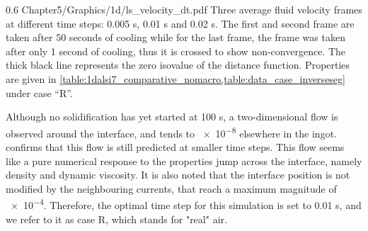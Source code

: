 



\begin{figureth}
{0.6}
{Chapter5/Graphics/1d/ls_velocity_dt.pdf}
{Three average fluid velocity frames at different time steps: 0.005 s, 0.01 s and 0.02 s. The first and second frame are taken after 
50 seconds of cooling while for the last frame, the frame was taken after only 1 second of cooling, thus it is crossed to show non-convergence.
The thick black line represents the zero isovalue of the distance function. Properties are given in \cref{table:1dalsi7_comparative_nomacro,table:data_case_inverseseg}
under case ``R''.}
\label{fig:1dalsi7_velocity_dt}
\end{figureth}

Although no solidification has yet started at 100 s, a two-dimensional flow is observed around the interface, and tends to \SI{e-8}{\uvelocity} elsewhere in the ingot.
 confirms that this flow is still predicted at smaller time steps. 
This flow seems like a pure numerical response
to the properties jump across the interface, namely density and dynamic viscosity. It is also noted that the interface position
is not modified by the neighbouring currents, that reach a maximum magnitude of \SI{e-4}{\uvelocity}. 
Therefore, the optimal time step for this simulation is set to 0.01 s, and we refer to it as case R, which stands for "real" air.


